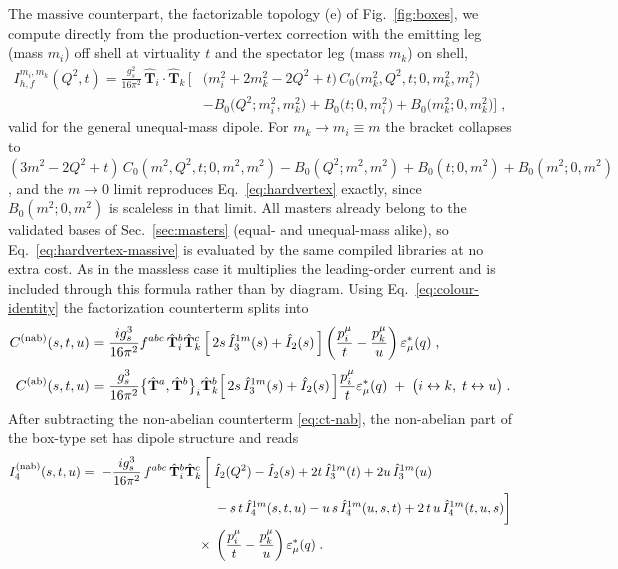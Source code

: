 \documentclass[11pt,a4paper]{article}
\newcommand{\eps}{\varepsilon}
\newcommand{\Top}[1]{\hat{\mathbf{T}}_{#1}}
\newcommand{\Ihat}{\hat{I}}
\begin{document}
The massive counterpart, the factorizable topology (e) of Fig.~\ref{fig:boxes},
we compute directly from the production-vertex correction with the emitting leg
(mass $m_i$) off shell at virtuality $t$ and the spectator leg (mass $m_k$) on
shell,
\begin{equation}
  \begin{split}
  I_{h,f}^{m_i,m_k}(Q^2,t)=\frac{g_s^2}{16\pi^2}\,\Top{i}\!\cdot\Top{k}\,
  \Big[&\big(m_i^2+2m_k^2-2Q^2+t\big)\,C_0\big(m_k^2,Q^2,t;0,m_k^2,m_i^2\big)\\
  &-B_0\big(Q^2;m_i^2,m_k^2\big)+B_0\big(t;0,m_i^2\big)+B_0\big(m_k^2;0,m_k^2\big)\Big]\;,
  \end{split}
  \label{eq:hardvertex-massive}
\end{equation}
valid for the general unequal-mass dipole. For $m_k\to m_i\equiv m$ the bracket
collapses to
$(3m^2-2Q^2+t)\,C_0(m^2,Q^2,t;0,m^2,m^2)-B_0(Q^2;m^2,m^2)+B_0(t;0,m^2)+B_0(m^2;0,m^2)$,
and the $m\to0$ limit reproduces Eq.~\eqref{eq:hardvertex} exactly, since
$B_0(m^2;0,m^2)$ is scaleless in that limit. All masters already belong to the
validated bases of Sec.~\ref{sec:masters} (equal- and unequal-mass alike), so
Eq.~\eqref{eq:hardvertex-massive} is evaluated by the same compiled libraries at
no extra cost. As in the massless
case it multiplies the leading-order current and is included through this formula
rather than by diagram. Using
Eq.~\eqref{eq:colour-identity} the factorization counterterm splits into
\begin{align}
  C^{\rm(nab)}(s,t,u)&=\frac{i g_s^3}{16\pi^2}f^{abc}\,\Top{i}^b\Top{k}^c\,
    \Big[\,2s\,\Ihat_3^{1m}(s)+\Ihat_2(s)\,\Big]
    \left(\frac{p_i^\mu}{t}-\frac{p_k^\mu}{u}\right)\eps^*_\mu(q)\;,
  \label{eq:ct-nab}\\[1mm]
  C^{\rm(ab)}(s,t,u)&=\frac{g_s^3}{16\pi^2}\big\{\Top{}^a,\Top{}^b\big\}_i\Top{k}^b
    \Big[\,2s\,\Ihat_3^{1m}(s)+\Ihat_2(s)\,\Big]\frac{p_i^\mu}{t}\eps^*_\mu(q)
    \;+\;\big(i\leftrightarrow k,\;t\leftrightarrow u\big)\;.
  \label{eq:ct-ab}
\end{align}
After subtracting the non-abelian counterterm \eqref{eq:ct-nab}, the non-abelian
part of the box-type set has dipole structure and reads~\cite{Campbell:2025}
\begin{equation}
\begin{split}
  I_4^{\rm(nab)}(s,t,u)=\;-\frac{ig_s^3}{16\pi^2}\,f^{abc}\,\Top{i}^b\Top{k}^c\,
  \bigg[\;&\Ihat_2(Q^2)-\Ihat_2(s)+2t\,\Ihat_3^{1m}(t)+2u\,\Ihat_3^{1m}(u)\\
  &-s\,t\,\Ihat_4^{1m}(s,t,u)-u\,s\,\Ihat_4^{1m}(u,s,t)
   +2\,t\,u\,\Ihat_4^{1m}(t,u,s)\bigg]\\
  \times\;&\left(\frac{p_i^\mu}{t}-\frac{p_k^\mu}{u}\right)\eps^*_\mu(q)\;.
\end{split}
\label{eq:I4nab}
\end{equation}
\end{document}
